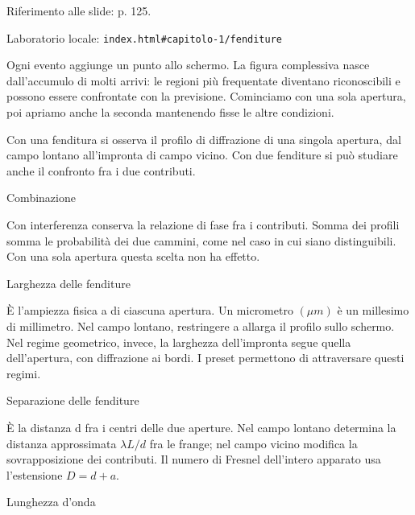 {\sffamily\small\color{Ink!70} Riferimento alle slide: p. 125.\par}

{\sffamily\small\color{Ink!70} Laboratorio locale: \nolinkurl{index.html#capitolo-1/fenditure}\par}

Ogni evento aggiunge un punto allo schermo. La figura complessiva nasce dall'accumulo di molti arrivi: le regioni più frequentate diventano riconoscibili e possono essere confrontate con la previsione. Cominciamo con una sola apertura, poi apriamo anche la seconda mantenendo fisse le altre condizioni.\par



Con una fenditura si osserva il profilo di diffrazione di una singola apertura, dal campo lontano all'impronta di campo vicino. Con due fenditure si può studiare anche il confronto fra i due contributi.\par

Combinazione\par

\guillemotleft{}Con interferenza\guillemotright{} conserva la relazione di fase fra i contributi. \guillemotleft{}Somma dei profili\guillemotright{} somma le probabilità dei due cammini, come nel caso in cui siano distinguibili. Con una sola apertura questa scelta non ha effetto.\par

Larghezza delle fenditure\par

È l'ampiezza fisica a di ciascuna apertura. Un micrometro \((\mu m)\) è un millesimo di millimetro. Nel campo lontano, restringere a allarga il profilo sullo schermo. Nel regime geometrico, invece, la larghezza dell'impronta segue quella dell'apertura, con diffrazione ai bordi. I preset permettono di attraversare questi regimi.\par

Separazione delle fenditure\par

È la distanza d fra i centri delle due aperture. Nel campo lontano determina la distanza approssimata \(\lambda L/d\) fra le frange; nel campo vicino modifica la sovrapposizione dei contributi. Il numero di Fresnel dell'intero apparato usa l'estensione \(D=d+a\).\par

Lunghezza d'onda\par

